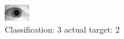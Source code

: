 \begin{figure}[h!]
\begin{center}
\includegraphics[width=0.60\columnwidth]{figures/ID1606_class_3_target_2.png}
\end{center}
\caption{ Classification: 3 actual target: 2}
\label{fig:ID1606_class_3_target_2}
\end{figure}
